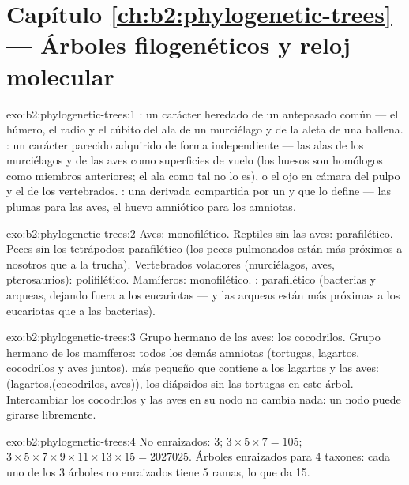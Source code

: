 \section*{Capítulo \ref{ch:b2:phylogenetic-trees} --- Árboles filogenéticos y reloj molecular}

\begin{solution}{exo:b2:phylogenetic-trees:1}
: un carácter heredado de un antepasado común --- el húmero, el
radio y el cúbito del ala de un murciélago y de la aleta de una ballena.
: un carácter parecido adquirido de forma independiente --- las
alas de los murciélagos y de las aves como superficies de vuelo (los
huesos son homólogos como miembros anteriores; el ala como tal no lo es),
o el ojo en cámara del pulpo y el de los vertebrados. : una
 derivada compartida por un  y que lo define --- las plumas
para las aves, el huevo amniótico para los amniotas.
\end{solution}

\begin{solution}{exo:b2:phylogenetic-trees:2}
Aves: monofilético. Reptiles sin las aves: parafilético. Peces sin los
tetrápodos: parafilético (los peces pulmonados están más próximos a
nosotros que a la trucha). Vertebrados voladores (murciélagos, aves,
pterosaurios): polifilético. Mamíferos: monofilético. :
parafilético (bacterias y arqueas, dejando fuera a los eucariotas --- y las
arqueas están más próximas a los eucariotas que a las bacterias).
\end{solution}

\begin{solution}{exo:b2:phylogenetic-trees:3}
Grupo hermano de las aves: los cocodrilos. Grupo hermano de los
mamíferos: todos los demás amniotas (tortugas, lagartos, cocodrilos y aves
juntos).  más pequeño que contiene a los lagartos y las aves:
(lagartos,(cocodrilos, aves)), los diápsidos sin las tortugas en este
árbol. Intercambiar los cocodrilos y las aves en su nodo no cambia nada:
un nodo puede girarse libremente.
\end{solution}

\begin{solution}{exo:b2:phylogenetic-trees:4}
No enraizados: $3$; $3\times 5\times 7 = 105$; $3\times 5\times
7\times 9\times 11\times 13\times 15 = \num{2027025}$. Árboles enraizados
para 4 taxones: cada uno de los 3 árboles no enraizados tiene 5 ramas, lo
que da 15.
\end{solution}


